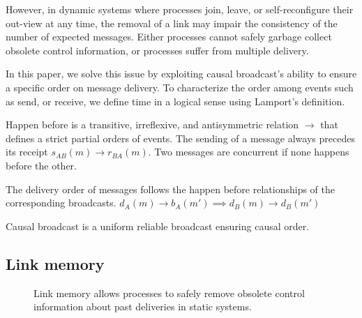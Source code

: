 However, in dynamic systems where processes join, leave, or self-reconfigure
their out-view at any time, the removal of a link may impair the consistency of
the number of expected messages. Either processes cannot safely garbage collect
obsolete control information, or processes suffer from multiple delivery.

In this paper, we solve this issue by exploiting causal broadcast's ability to
ensure a specific order on message delivery. To characterize the order among
events such as send, or receive, we define time in a logical sense using
Lamport’s definition.

\begin{definition}
  Happen before is a transitive, irreflexive, and antisymmetric relation
  $\rightarrow$ that defines a strict partial orders of events. The sending of a
  message always precedes its receipt $s_{AB}(m) \rightarrow r_{BA}(m)$. Two
  messages are concurrent if none happens before the other.
\end{definition}

\begin{definition}
  The delivery order of messages follows the happen before relationships of the
  corresponding broadcasts.
  $d_A(m) \rightarrow b_A(m') \implies d_B(m) \rightarrow d_B(m')$
\end{definition}

\begin{definition}
  Causal broadcast is a uniform reliable broadcast ensuring causal order.
\end{definition}


\subsection{Link memory}

\begin{figure*}
  \begin{center}
    \hspace{30pt}
    \hspace{30pt}
    \hspace{30pt}
    \caption{\label{fig:memorylink}Link memory allows processes to safely remove
      obsolete control information about past deliveries in static systems.}
  \end{center}
\end{figure*}

